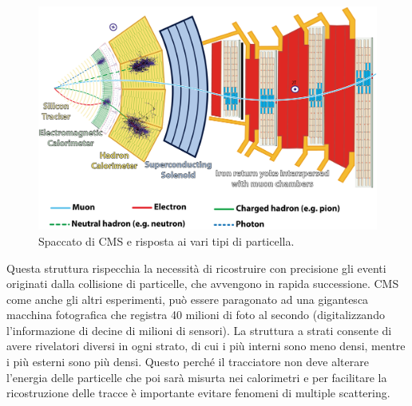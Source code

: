 \begin{figure}
\centering
\includegraphics[scale=0.8]{Immagini/CMSbis}
\caption{Spaccato di CMS e risposta ai vari tipi di particella.}
\label{CMSbis}
\end{figure}

Questa struttura rispecchia la necessità di ricostruire con precisione gli eventi originati dalla collisione di particelle, che avvengono in rapida successione. CMS come anche gli altri esperimenti, può essere paragonato ad una gigantesca macchina fotografica che registra 40 milioni di foto al secondo (digitalizzando l'informazione di decine di milioni di sensori). 
La struttura a strati consente di avere rivelatori diversi in ogni strato, di cui i più interni sono meno densi, mentre i più esterni sono più densi. Questo perché il tracciatore non deve alterare l'energia delle particelle che poi sarà misurta nei calorimetri e per facilitare la ricostruzione delle tracce è importante evitare fenomeni di multiple scattering.

